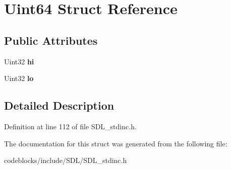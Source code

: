 \hypertarget{structUint64}{\section{Uint64 Struct Reference}
\label{structUint64}
}
\subsection*{Public Attributes}
\begin{DoxyCompactItemize}
\item 
\hypertarget{structUint64_aebe59cbeb37832b60d27071eca9fef3f}{Uint32 {\bfseries hi}}\label{structUint64_aebe59cbeb37832b60d27071eca9fef3f}

\item 
\hypertarget{structUint64_a110735976529c94010e0e1ff33bcb116}{Uint32 {\bfseries lo}}\label{structUint64_a110735976529c94010e0e1ff33bcb116}

\end{DoxyCompactItemize}


\subsection{Detailed Description}


Definition at line 112 of file S\+D\+L\+\_\+stdinc.\+h.



The documentation for this struct was generated from the following file\+:\begin{DoxyCompactItemize}
\item 
codeblocks/include/\+S\+D\+L/S\+D\+L\+\_\+stdinc.\+h\end{DoxyCompactItemize}
